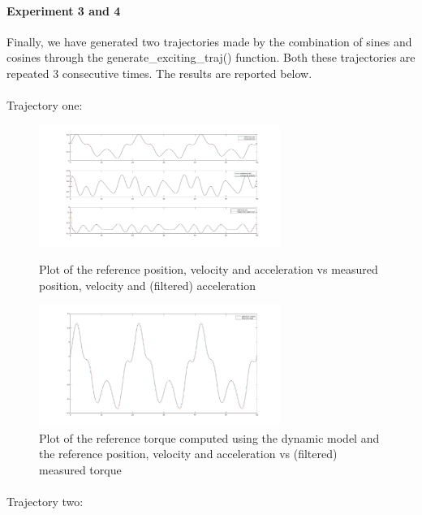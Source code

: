 \documentclass{article}
\begin{document}
\paragraph{Experiment 3 and 4}Finally, we have generated two trajectories made by the combination of sines and cosines through the generate\_exciting\_traj() function. Both these trajectories are repeated 3 consecutive times. The results are reported below.
\paragraph{}Trajectory one:

\begin{figure}[!htbp]
\centering
\includegraphics[width=0.7\textwidth]{images/1-dof/new_experiment3_traj.png}
\caption{Plot of the reference position, velocity and acceleration vs measured position, velocity and (filtered) acceleration}
\includegraphics[width=0.7\textwidth]{images/1-dof/new_experiment3.png}
\caption{Plot of the reference torque computed using the dynamic model and the reference position, velocity and acceleration vs (filtered) measured torque}
\end{figure}
\FloatBarrier

\pagebreak
\paragraph{}Trajectory two:
\end{document}
